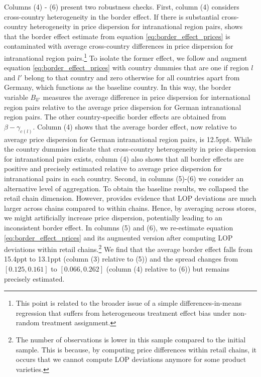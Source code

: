 Columns (4) - (6) present two robustness checks. First, column (4) considers cross-country heterogeneity in the border effect. If there is substantial cross-country heterogeneity in price dispersion for intranational region pairs, \citet{Gorodnichenko2009} shows that the border effect estimate from equation \ref{eq:border_effect_prices} is contaminated with average cross-country differences in price dispersion for intranational region pairs.\footnote{This point is related to the broader issue of a simple differences-in-means regression that suffers from heterogeneous treatment effect bias under non-random treatment assignment.} To isolate the former effect, we follow \citet{Gorodnichenko2009} and augment equation \ref{eq:border_effect_prices} with country dummies that are one if region $l$ and $l'$ belong to that country and zero otherwise for all countries apart from Germany, which functions as the baseline country. In this way, the border variable $B_{ll'}$ measures the average difference in price dispersion for international region pairs relative to the average price dispersion for German intranational region pairs. The other country-specific border effects are obtained from $\beta - \gamma_{c(l)}$. Column (4) shows that the average border effect, now relative to average price dispersion for German intranational region pairs, is 12.5ppt. While the country dummies indicate that cross-country heterogeneity in price dispersion for intranational pairs exists, column (4) also shows that all border effects are positive and precisely estimated relative to average price dispersion for intranational pairs in each country. Second, in columns (5)-(6) we consider an alternative level of aggregation. To obtain the baseline results, we collapsed the retail chain dimension. However, \citet{Dellavigna2019} provides evidence that LOP deviations are much larger across chains compared to within chains. Hence, by averaging across stores, we might artificially increase price dispersion, potentially leading to an inconsistent border effect. In columns (5) and (6), we re-estimate equation \ref{eq:border_effect_prices} and its augmented version after computing LOP deviations within retail chains.\footnote{The number of observations is lower in this sample compared to the initial sample. This is because, by computing price differences within retail chains, it occurs that we cannot compute LOP deviations anymore for some product varieties.} We find that the average border effect falls from 15.4ppt to 13.1ppt (column (3) relative to (5)) and the spread changes from $[0.125,0.161]$ to $[0.066,0.262]$ (column (4) relative to (6)) but remains precisely estimated.

